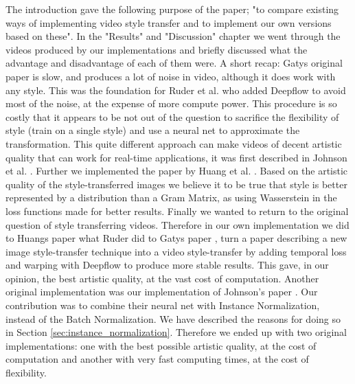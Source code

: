 The introduction gave the following purpose of the paper; "to compare existing ways of implementing video style transfer and to implement our own versions based on these". In the "Results" and "Discussion" chapter we went through the videos produced by our implementations and briefly discussed what the advantage and disadvantage of each of them were.\newline\newline 
A short recap: Gatys \cite{Gatys:1} original paper is slow, and produces a lot of noise in video, although it does work with any style. This was the foundation for Ruder et al. \cite{Ruder:1} who added Deepflow to avoid most of the noise, at the expense of more compute power. This procedure is so costly that it appears to be not out of the question to sacrifice the flexibility of style (train on a single style) and use a neural net to approximate the transformation. This quite different approach can make videos of decent artistic quality that can work for real-time applications, it was first described in Johnson et al. \cite{Johnson:1}. Further we implemented the paper by Huang et al. \cite{Huang:1}. Based on the artistic quality of the style-transferred images we believe it to be true that style is better represented by a distribution than a Gram Matrix, as using Wasserstein in the loss functions made for better results.\newline\newline 
Finally we wanted to return to the original question of style transferring videos. Therefore in our own implementation we did to Huangs paper \cite{Huang:1} what Ruder \cite{Ruder:1} did to Gatys paper \cite{Gatys:1}, turn a paper describing a new image style-transfer technique into a video style-transfer by adding temporal loss and warping with Deepflow to produce more stable results. This gave, in our opinion, the best artistic quality, at the vast cost of computation.\newline\newline
Another original implementation was our implementation of Johnson's paper \cite{Johnson:1}. Our contribution was to combine their neural net with Instance Normalization, instead of the Batch Normalization. We have described the reasons for doing so in Section \ref{sec:instance_normalization}. Therefore we ended up with two original implementations: one with the best possible artistic quality, at the cost of computation and another with very fast computing times, at the cost of flexibility.
\newpage
